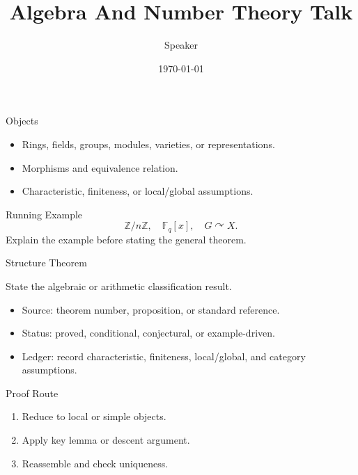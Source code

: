 \documentclass[10pt,aspectratio=169]{beamer}
\title{Algebra And Number Theory Talk}
\author{Speaker}
\date{\today}
\begin{document}
\begin{frame}\titlepage\end{frame}

\begin{frame}{Objects}
  \begin{itemize}
    \item Rings, fields, groups, modules, varieties, or representations.
    \item Morphisms and equivalence relation.
    \item Characteristic, finiteness, or local/global assumptions.
  \end{itemize}
\end{frame}

\begin{frame}{Running Example}
  \[
    \mathbb{Z}/n\mathbb{Z}, \quad \mathbb{F}_q[x], \quad G \curvearrowright X.
  \]
  Explain the example before stating the general theorem.
\end{frame}

\begin{frame}{Structure Theorem}
  \begin{theorem}
    State the algebraic or arithmetic classification result.
  \end{theorem}
  \begin{itemize}
    \item Source: theorem number, proposition, or standard reference.
    \item Status: proved, conditional, conjectural, or example-driven.
    \item Ledger: record characteristic, finiteness, local/global, and category assumptions.
  \end{itemize}
\end{frame}

\begin{frame}{Proof Route}
  \begin{enumerate}
    \item Reduce to local or simple objects.
    \item Apply key lemma or descent argument.
    \item Reassemble and check uniqueness.
  \end{enumerate}
\end{frame}
\end{document}
